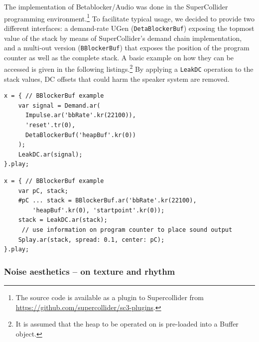 \documentclass[letterpaper, 12pt]{article}
\begin{document}
The implementation of Betablocker/Audio was done in the SuperCollider programming environment.\footnote{The source code is available as a plugin to Supercollider from  \url{https://github.com/supercollider/sc3-plugins}.}
To facilitate typical usage, we decided to provide two different interfaces: a demand-rate UGen (\texttt{DetaBlockerBuf}) exposing the topmost value of the stack by means of SuperCollider's demand chain implementation, and a multi-out version (\texttt{BBlockerBuf}) that exposes the position of the program counter as well as  the complete stack.
A basic example on how they can be accessed is given in the following listings.\footnote{
It is assumed that the heap to be operated on is pre-loaded into a Buffer object.
}
By applying a \texttt{LeakDC} operation to the stack values, DC offsets that could harm the speaker system are removed.


\begin{Verbatim}[fontfamily=courier, xleftmargin=\parindent]
x = { // BBlockerBuf example
	var signal = Demand.ar(
	  Impulse.ar('bbRate'.kr(22100)),
	  'reset'.tr(0),
	  DetaBlockerBuf('heapBuf'.kr(0))
	);
	LeakDC.ar(signal);
}.play;
\end{Verbatim}

\begin{Verbatim}[fontfamily=courier, xleftmargin=\parindent]
x = { // BBlockerBuf example
	var pC, stack;
	#pC ... stack = BBlockerBuf.ar('bbRate'.kr(22100),
		'heapBuf'.kr(0), 'startpoint'.kr(0));
	stack = LeakDC.ar(stack);
	 // use information on program counter to place sound output
	Splay.ar(stack, spread: 0.1, center: pC);
}.play;
\end{Verbatim}
\parskip 18pt

\subsubsection{Noise aesthetics -- on texture and rhythm}
\label{sub:noise_aesthetics}
\end{document}
